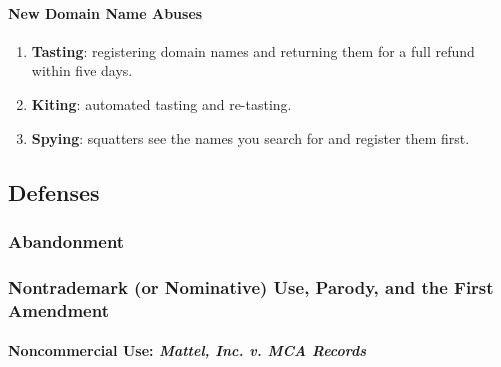 \paragraph{New Domain Name Abuses}

\begin{enumerate}
    \item \textbf{Tasting}: registering domain names and returning them for a 
    full refund within five days.
    \item \textbf{Kiting}: automated tasting and re-tasting.
    \item \textbf{Spying}: squatters see the names you search for and register 
    them first.
\end{enumerate}

\subsection{Defenses}

\subsubsection{Abandonment}


\subsubsection{Nontrademark (or Nominative) Use, Parody, and the First 
Amendment}

\paragraph{Noncommercial Use: \emph{Mattel, Inc. v. MCA Records}}

